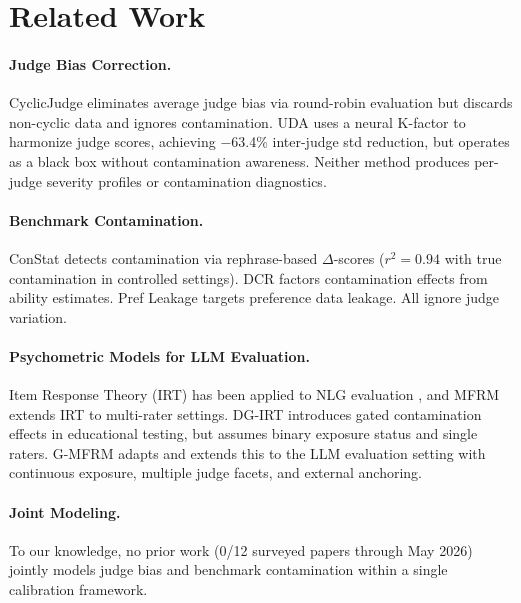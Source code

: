 \documentclass[11pt]{article}
\begin{document}
\section{Related Work}
\label{sec:related}

\paragraph{Judge Bias Correction.}
CyclicJudge \cite{bai2024cyclicjudge} eliminates average judge bias via round-robin evaluation but discards non-cyclic data and ignores contamination.
UDA \cite{kwon2024uda} uses a neural K-factor to harmonize judge scores, achieving $-$63.4\% inter-judge std reduction, but operates as a black box without contamination awareness.
Neither method produces per-judge severity profiles or contamination diagnostics.

\paragraph{Benchmark Contamination.}
ConStat \cite{dekoninck2024constat} detects contamination via rephrase-based $\Delta$-scores ($r^2 = 0.94$ with true contamination in controlled settings).
DCR \cite{xu2024dcr} factors contamination effects from ability estimates.
Pref Leakage \cite{dong2024prefleakage} targets preference data leakage.
All ignore judge variation.

\paragraph{Psychometric Models for LLM Evaluation.}
Item Response Theory (IRT) has been applied to NLG evaluation \cite{otani2016irt}, and MFRM extends IRT to multi-rater settings.
DG-IRT \cite{sato2024dg-irt} introduces gated contamination effects in educational testing, but assumes binary exposure status and single raters.
G-MFRM adapts and extends this to the LLM evaluation setting with continuous exposure, multiple judge facets, and external anchoring.

\paragraph{Joint Modeling.}
To our knowledge, no prior work (0/12 surveyed papers through May 2026) jointly models judge bias and benchmark contamination within a single calibration framework.

\end{document}
